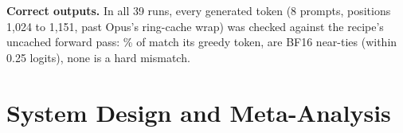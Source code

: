 \documentclass{article}
\newif\ifshowhumanmarkers \showhumanmarkersfalse
\newcommand{\humantag}[1]{{\color{humanframe}\sffamily\scriptsize\bfseries HUMAN AUTHOR MUST REWRITE/VERIFY [#1]}\ }
\newcommand{\humanauthor}[2][]{\ifshowhumanmarkers\begin{humanbox}\humantag{#1}#2\end{humanbox}\else #2\par\fi}
\begin{document}
 \textbf{Correct outputs.} In all 39 runs, every generated token (8 prompts, positions 1{,}024 to 1{,}151, past Opus's ring-cache wrap) was checked against the recipe's uncached forward pass: \CRSixAgreePct\% of \CRSixTokensChecked{} match its greedy token, \CRSixNearTies{} are BF16 near-ties (within 0.25 logits), none is a hard mismatch.
\label{partoneend}

\clearpage
\section{System Design and Meta-Analysis}\label{parttwo}
\end{document}
